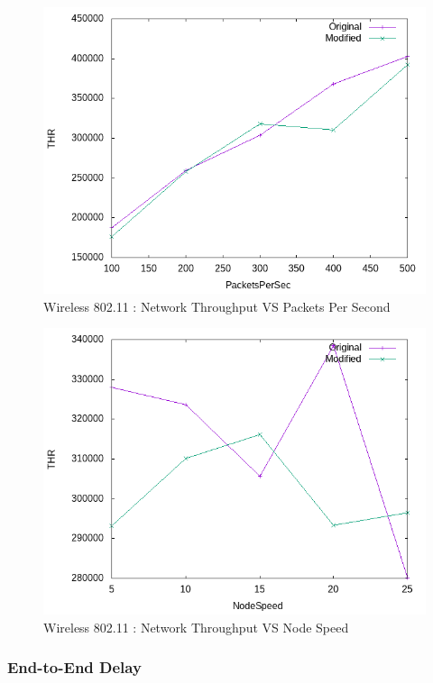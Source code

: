     \begin{figure}[!h] 
        \centering
        \includegraphics[width=.9\textwidth]{Pictures/Wireless802.11Mobile/Combined/THRVSPacketsPerSec.png}
         \caption{Wireless 802.11 : Network Throughput VS Packets Per Second}
    \end{figure}
    
    \begin{figure}[!h] 
        \centering
        \includegraphics[width=.9\textwidth]{Pictures/Wireless802.11Mobile/Combined/THRVSNodeSpeed.png}
         \caption{Wireless 802.11 : Network Throughput VS Node Speed}
    \end{figure}

\newpage
\subsubsection{End-to-End Delay}

